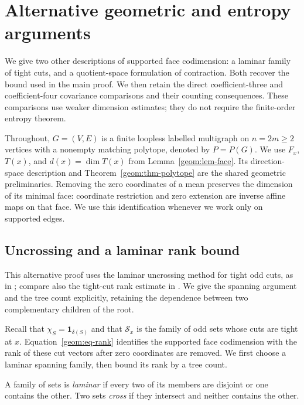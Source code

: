 \section{Alternative geometric and entropy arguments}
\label{a:section}

We give two other descriptions of supported face codimension: a laminar
family of tight cuts, and a quotient-space formulation of contraction.
Both recover the bound used in the main proof. We then retain the direct
coefficient-three and coefficient-four covariance comparisons and their
counting consequences. These comparisons use weaker dimension estimates;
they do not require the finite-order entropy theorem.

Throughout, \(G=(V,E)\) is a finite loopless labelled multigraph on
\(n=2m\ge2\) vertices with a nonempty matching polytope, denoted by \(P=P(G)\). We use
\(F_x\), \(T(x)\), and \(d(x)=\dim T(x)\) from
Lemma~\ref{geom:lem-face}. Its direction-space description and
Theorem~\ref{geom:thm-polytope} are the shared geometric preliminaries.
Removing the zero coordinates of a mean preserves the dimension of its
minimal face: coordinate restriction and zero extension are inverse
affine maps on that face. We use this identification whenever we work
only on supported edges.

\subsection{Uncrossing and a laminar rank bound}

This alternative proof uses the laminar uncrossing method for tight odd cuts,
as in \cite[full version, Lemma~2.2 and Appendix~A]{SvenssonTarnawski2017};
compare also the tight-cut rank estimate in
\cite[Lemma~6.5]{AbdiCornuejolsDadushDalirrooyfard2026}. We give the spanning argument and the
tree count explicitly, retaining the dependence between two
complementary children of the root.

Recall that \(\chi_S=\mathbf1_{\delta(S)}\) and that
\(\mathcal S_x\) is the family of odd sets whose cuts are tight at
\(x\). Equation~\eqref{geom:eq-rank} identifies the supported face
codimension with the rank of these cut vectors after zero coordinates
are removed. We first choose a
laminar spanning family, then bound its rank by a tree count.

A family of sets is \emph{laminar} if every two of its members are
disjoint or one contains the other. Two sets \emph{cross} if they
intersect and neither contains the other.

